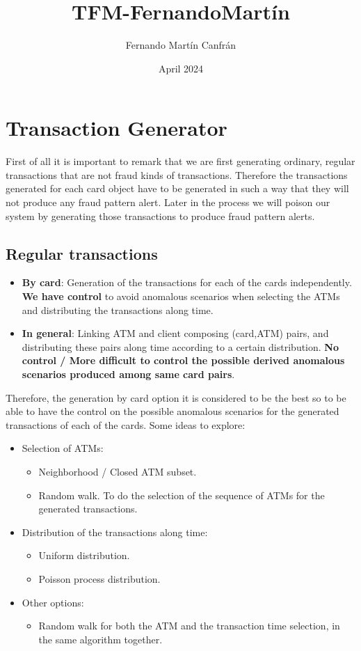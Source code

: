 \documentclass{article}
\title{TFM-FernandoMartín}
\author{Fernando Martín Canfrán}
\date{April 2024}
\begin{document}
\section{Transaction Generator}

First of all it is important to remark that we are first generating ordinary, 
regular transactions that are not fraud kinds of transactions. Therefore the 
transactions generated for each card object have to be generated in such a way
that they will not produce any fraud pattern alert. Later in the process we 
will poison our system by generating those transactions to produce fraud pattern 
alerts.

\subsection{Regular transactions}

\begin{tcolorbox}
  \begin{itemize}
    \item \textbf{By card}: Generation of the transactions for each of the cards independently. \textbf{We have
    control} to avoid anomalous scenarios when selecting the ATMs and distributing the transactions along time.
    \item \textbf{In general}: Linking ATM and client composing (card,ATM) pairs, and distributing these pairs along
    time according to a certain distribution. \textbf{No control / More difficult to control the possible derived
    anomalous scenarios produced among same card pairs}.
  \end{itemize}
\end{tcolorbox}

Therefore, the generation by card option it is considered to be the best so to be able to have the control
on the possible anomalous scenarios for the generated transactions of each of the cards. Some ideas to explore:

\begin{itemize}
  \item Selection of ATMs:
  \begin{itemize}
    \item Neighborhood / Closed ATM subset.
    \item Random walk. To do the selection of the sequence of ATMs for the generated transactions.
  \end{itemize}
  \item Distribution of the transactions along time:
  \begin{itemize}
    \item Uniform distribution.
    \item Poisson process distribution.
  \end{itemize}
  \item Other options:
  \begin{itemize}
    \item Random walk for both the ATM and the transaction time selection, in the same algorithm together.
  \end{itemize}
\end{itemize}
\end{document}
